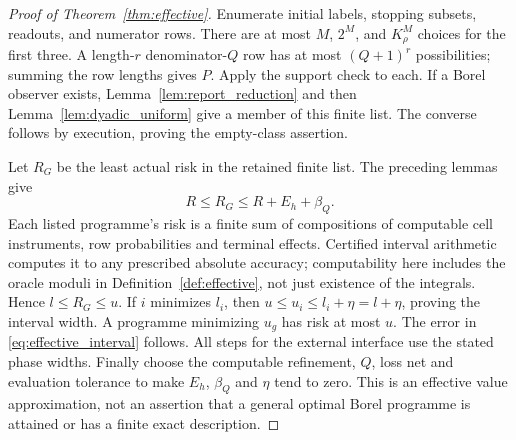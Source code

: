 \begin{proof}[Proof of Theorem~\ref{thm:effective}]
Enumerate initial labels, stopping subsets, readouts, and numerator rows. There are at most $M$, $2^M$, and $K_\rho^M$ choices for the first three. A length-$r$ denominator-$Q$ row has at most $(Q+1)^r$ possibilities; summing the row lengths gives $P$. Apply the support check to each. If a Borel observer exists, Lemma~\ref{lem:report_reduction} and then Lemma~\ref{lem:dyadic_uniform} give a member of this finite list. The converse follows by execution, proving the empty-class assertion.

Let $R_G$ be the least actual risk in the retained finite list. The preceding lemmas give
\[
 R\le R_G\le R+E_h+\beta_Q.
\]
Each listed programme's risk is a finite sum of compositions of computable cell instruments, row probabilities and terminal effects. Certified interval arithmetic computes it to any prescribed absolute accuracy; computability here includes the oracle moduli in Definition~\ref{def:effective}, not just existence of the integrals. Hence $l\le R_G\le u$. If $i$ minimizes $l_i$, then $u\le u_i\le l_i+\eta=l+\eta$, proving the interval width. A programme minimizing $u_g$ has risk at most $u$. The error in \eqref{eq:effective_interval} follows. All steps for the external interface use the stated phase widths. Finally choose the computable refinement, $Q$, loss net and evaluation tolerance to make $E_h$, $\beta_Q$ and $\eta$ tend to zero. This is an effective value approximation, not an assertion that a general optimal Borel programme is attained or has a finite exact description.
\end{proof}

